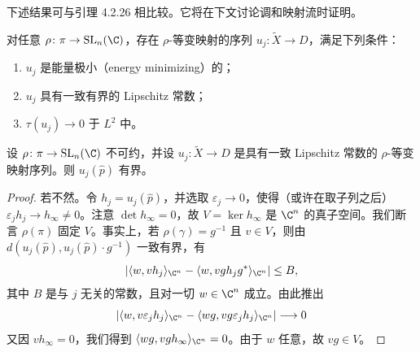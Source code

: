 下述结果可与引理 4.2.26 相比较。它将在下文讨论调和映射流时证明。

\begin{lemma}
对任意 $\rho\colon\pi\to\operatorname{SL}_n(\C)$，存在 $\rho$-等变映射的序列 $u_j\colon\widetilde X\to D$，满足下列条件：
\begin{enumerate}[label=(\roman*),leftmargin=3.2em,itemsep=1pt]
\item $u_j$ 是能量极小（energy minimizing）的；
\item $u_j$ 具有一致有界的 Lipschitz 常数；
\item $\tau(u_j)\to0$ 于 $L^2$ 中。
\end{enumerate}
\end{lemma}

\begin{lemma}
设 $\rho\colon\pi\to\operatorname{SL}_n(\C)$ 不可约，并设 $u_j\colon\widetilde X\to D$ 是具有一致 Lipschitz 常数的 $\rho$-等变映射序列。则 $u_j(\hat p)$ 有界。
\end{lemma}

\begin{proof}
若不然。令 $h_j=u_j(\hat p)$，并选取 $\varepsilon_j\to0$，使得（或许在取子列之后）$\varepsilon_jh_j\to h_\infty\neq0$。注意 $\det h_\infty=0$，故 $V=\ker h_\infty$ 是 $\C^n$ 的真子空间。我们断言 $\rho(\pi)$ 固定 $V$。事实上，若 $\rho(\gamma)=g^{-1}$ 且 $v\in V$，则由 $d(u_j(\hat p),u_j(\hat p)\cdot g^{-1})$ 一致有界，有
\[
|\langle w,vh_j\rangle_{\C^n}-\langle w,vgh_jg^*\rangle_{\C^n}|\le B,
\]
其中 $B$ 是与 $j$ 无关的常数，且对一切 $w\in\C^n$ 成立。由此推出
\[
|\langle w,v\varepsilon_jh_j\rangle_{\C^n}-\langle wg,vg\varepsilon_jh_j\rangle_{\C^n}|\longrightarrow0
\]
又因 $vh_\infty=0$，我们得到 $\langle wg,vgh_\infty\rangle_{\C^n}=0$。由于 $w$ 任意，故 $vg\in V$。
\end{proof}

